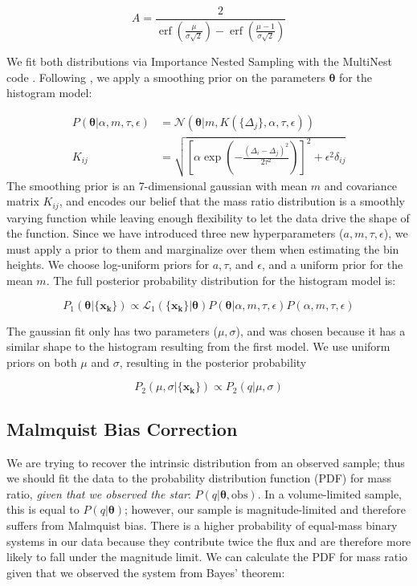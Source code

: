 \documentclass{emulateapj}
\renewcommand{\vec}[1]{\bm{#1}}
\DeclareMathOperator\erf{erf}
\begin{document}
\begin{equation}
A = \frac{2}{\erf\left(\frac{\mu}{\sigma \sqrt{2}}\right) - \erf\left(\frac{\mu - 1}{\sigma \sqrt{2}}\right)}
\end{equation}

We fit both distributions via Importance Nested Sampling with the MultiNest code \citep{multinest}. Following \citet{Foreman2014}, we apply a smoothing prior on the parameters $\vec{\theta}$ for the histogram model:

\begin{align}
P(\vec{\theta}| \alpha, m, \tau, \epsilon) &= \mathcal{N}(\vec{\theta} | m, K(\{\Delta_j\}, \alpha, \tau, \epsilon)) \\
K_{ij} &= \sqrt{\left[\alpha \exp{\left(-\frac{(\Delta_i - \Delta_j)^2}{2\tau^2}\right)}\right]^2 + \epsilon^2 \delta_{ij}}
\end{align}
The smoothing prior is an 7-dimensional gaussian with mean $m$ and covariance matrix $K_{ij}$, and encodes our belief that the mass ratio distribution is a smoothly varying function while leaving enough flexibility to let the data drive the shape of the function. Since we have introduced three new hyperparameters ($a, m, \tau, \epsilon$), we must apply a prior to them and marginalize over them when estimating the bin heights. We choose log-uniform priors for $a, \tau$, and $\epsilon$, and a uniform prior for the mean $m$. The full posterior probability distribution for the histogram model is:

\begin{equation}
P_1(\vec{\theta} | \{\vec{x_k}\}) \propto \mathcal{L}_1(\{\vec{x_k}\}| \vec{\theta}) P(\vec{\theta}| \alpha, m, \tau, \epsilon) P(\alpha, m, \tau, \epsilon)
\end{equation}

The gaussian fit only has two parameters ($\mu, \sigma$), and was chosen because it has a similar shape to the histogram resulting from the first model. We use uniform priors on both $\mu$ and $\sigma$, resulting in the posterior probability 

\begin{equation}
P_2(\mu, \sigma | \{\vec{x_k}\}) \propto P_2(q|\mu, \sigma) 
\end{equation}

\subsection{Malmquist Bias Correction}

We are trying to recover the intrinsic distribution from an observed sample; thus we should fit the data to the probability distribution function (PDF) for mass ratio, \emph{given that we observed the star}: $P(q|\vec{\theta}, \mathrm{obs})$. In a volume-limited sample, this is equal to $P(q|\vec{\theta})$; however, our sample is magnitude-limited and therefore suffers from Malmquist bias. There is a higher probability of equal-mass binary systems in our data because they contribute twice the flux and are therefore more likely to fall under the magnitude limit. We can calculate the PDF for mass ratio given that we observed the system from Bayes' theorem:
\end{document}
